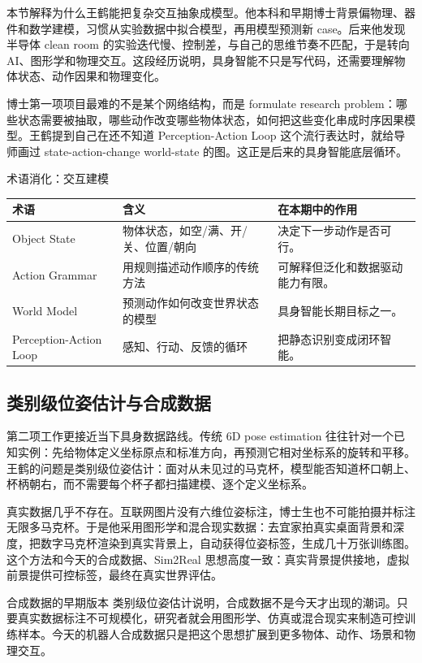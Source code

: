 \documentclass[a4paper]{article}
\begin{document}
本节解释为什么王鹤能把复杂交互抽象成模型。他本科和早期博士背景偏物理、器件和数学建模，习惯从实验数据中拟合模型，再用模型预测新 case。后来他发现半导体 clean room 的实验迭代慢、控制差，与自己的思维节奏不匹配，于是转向 AI、图形学和物理交互。这段经历说明，具身智能不只是写代码，还需要理解物体状态、动作因果和物理变化。

博士第一项项目最难的不是某个网络结构，而是 formulate research problem：哪些状态需要被抽取，哪些动作改变哪些物体状态，如何把这些变化串成时序因果模型。王鹤提到自己在还不知道 Perception-Action Loop 这个流行表达时，就给导师画过 state-action-change world-state 的图。这正是后来的具身智能底层循环。

\begin{knowledgebox}{术语消化：交互建模}
\begin{tabularx}{\textwidth}{p{}p{}X}
\toprule
术语 & 含义 & 在本期中的作用 \\
\midrule
Object State & 物体状态，如空/满、开/关、位置/朝向 & 决定下一步动作是否可行。 \\
Action Grammar & 用规则描述动作顺序的传统方法 & 可解释但泛化和数据驱动能力有限。 \\
World Model & 预测动作如何改变世界状态的模型 & 具身智能长期目标之一。 \\
Perception-Action Loop & 感知、行动、反馈的循环 & 把静态识别变成闭环智能。 \\
\bottomrule
\end{tabularx}
\end{knowledgebox}

\subsection{类别级位姿估计与合成数据}

第二项工作更接近当下具身数据路线。传统 6D pose estimation 往往针对一个已知实例：先给物体定义坐标原点和标准方向，再预测它相对坐标系的旋转和平移。王鹤的问题是类别级位姿估计：面对从未见过的马克杯，模型能否知道杯口朝上、杯柄朝右，而不需要每个杯子都扫描建模、逐个定义坐标系。

真实数据几乎不存在。互联网图片没有六维位姿标注，博士生也不可能拍摄并标注无限多马克杯。于是他采用图形学和混合现实数据：去宜家拍真实桌面背景和深度，把数字马克杯渲染到真实背景上，自动获得位姿标签，生成几十万张训练图。这个方法和今天的合成数据、Sim2Real 思想高度一致：真实背景提供接地，虚拟前景提供可控标签，最终在真实世界评估。

\begin{importantbox}{合成数据的早期版本}
类别级位姿估计说明，合成数据不是今天才出现的潮词。只要真实数据标注不可规模化，研究者就会用图形学、仿真或混合现实来制造可控训练样本。今天的机器人合成数据只是把这个思想扩展到更多物体、动作、场景和物理交互。
\end{importantbox}
\end{document}
